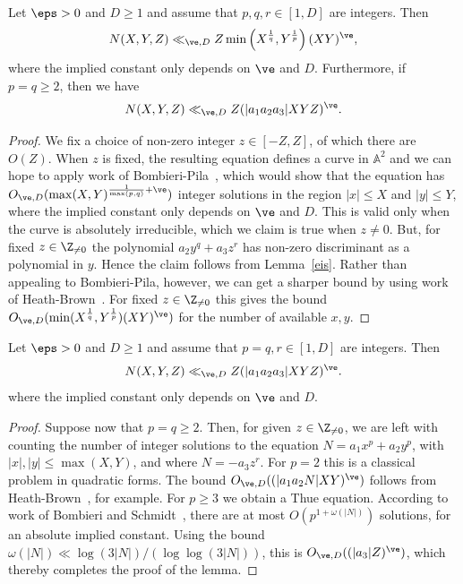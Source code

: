 \begin{lemma}\label{lem:MixedDetMethods}
  Let $\eps>0$ and $D\geq 1$ and
  assume that $p,q,r\in [1,D]$ are integers. Then
  \[
  N(X,Y,Z)\ll_{\ve,D} Z \min\left(X^{\frac{1}{q}}, Y^{\frac{1}{p}} \right) (XY)^\ve,
  \]
  where the implied constant only depends on $\ve$ and $D$. Furthermore,
  if $p=q\geq 2$,
  then we have
  \[
  N(X,Y,Z)\ll_{\ve,D} Z (|a_1a_2a_3|XYZ)^\ve.
  \]
\end{lemma}
\begin{proof}
  We fix a choice of non-zero integer $z\in [-Z,Z]$, of which there are $O(Z)$. When $z$ is fixed, the resulting equation defines a curve in $\mathbb{A}^2$ and we can hope to apply work of Bombieri-Pila~\cite[Theorem~4]{bp}, which would show that the equation has $O_{\ve,D}(\max(X,Y)^{\frac{1}{\max(p,q)}+\ve})$ integer solutions in the region $|x|\leq X$ and $|y|\leq Y$, where the implied constant only depends on $\ve$ and $D$. This is valid only when
  the curve is absolutely irreducible, which we claim is true when $z\neq 0$. But, for fixed $z\in \Z_{\neq 0}$ the
  polynomial $a_2y^q+a_3z^r$ has non-zero discriminant as a polynomial in $y$. Hence the claim follows from Lemma~\ref{eis}. Rather than appealing to Bombieri-Pila, however, we can get a sharper bound by using work of
  Heath-Brown~\cite[Theorem 15]{cime}. For fixed $z\in \Z_{\neq 0}$ this gives the bound
  $O_{\ve,D}(\min(X^{\frac{1}{q}},Y^{\frac{1}{p}})(XY)^\ve)$ for the number of available $x,y$.
\end{proof}

\begin{lemma}\label{lem:MixedThueMethods}
  Let $\eps>0$ and $D\geq 1$ and
  assume that $p=q,r\in [1,D]$ are integers. Then
  \[
  N(X,Y,Z)\ll_{\ve,D} Z (|a_1a_2a_3|XYZ)^\ve.
  \]
  where the implied constant only depends on $\ve$ and $D$.
\end{lemma}
\begin{proof}
  Suppose now that $p=q\geq 2$. Then, for given $z\in \Z_{\neq 0}$, we are left with counting the number of integer solutions to the equation $N=a_1x^p+a_2y^p$, with $|x|,|y|\leq \max(X,Y)$, and
  where $N=-a_3z^r$. For $p=2$ this is a classical problem in quadratic forms. The
  bound $O_{\ve,D}((|a_1a_2N|XY)^\ve)$ follows from Heath-Brown~\cite[Theorem~3]{cubic}, for example.
  For $p\geq 3$ we obtain a Thue equation. According to work of Bombieri and Schmidt~\cite{bs}, there are at most $O(p^{1+\omega(|N|)})$ solutions, for an absolute implied constant. Using the bound $\omega(|N|)\ll \log(3|N|)/(\log \log(3|N|))$, this is $O_{\ve,D}((|a_3|Z)^\ve)$, which thereby completes the proof of the lemma.
\end{proof}

